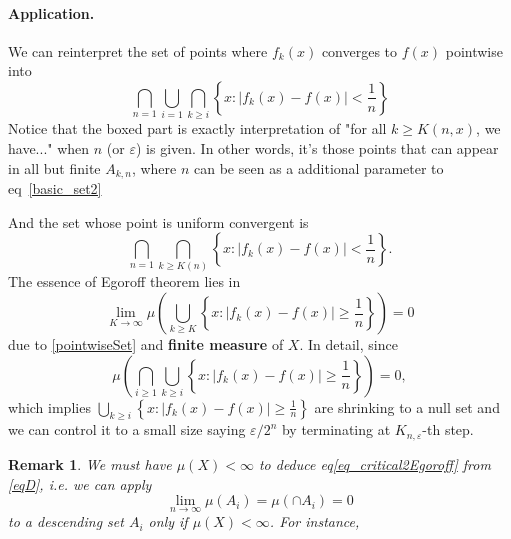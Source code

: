 \documentclass[dvipsnames]{article}
\numberwithin{equation}{section}
\newtheorem{Remark}[Theorem]{Remark}
\begin{document}
\paragraph{Application.} We can reinterpret the set of points where $f_{k}(x)$ converges to $f(x)$ pointwise into
\begin{equation}
    \label{pointwiseSet}
    \bigcap_{n=1} \boxed{\bigcup_{i=1} \bigcap_{k\geq i} \left\{x: |f_{k}(x)-f(x)|<\frac{1}{n}\right\}}
\end{equation}
Notice that the boxed part is exactly interpretation of "for all $k\geq K(n, x)$, we have..." when $n$ (or $\varepsilon$) is given. In other words, it's those points that can appear in all but finite $A_{k,n}$, where $n$ can be seen as a additional parameter to eq~\eqref{basic_set2} 

And the set whose point is uniform convergent is 
\begin{equation}
\label{uniformSet}
    \bigcap_{n=1} \boxed{\bigcap_{k\geq K(n)} \left\{x: |f_{k}(x)-f(x)|<\frac{1}{n}\right\}}.
\end{equation}
The essence of Egoroff theorem lies in 
\begin{equation}
\label{eq_critical2Egoroff}
    \lim_{K\to \infty} \mu\left(\bigcup_{k\geq K} \left\{x: |f_{k}(x)-f(x)|\geq \frac{1}{n}\right\}\right) = 0
\end{equation}
due to \eqref{pointwiseSet} and \textbf{finite measure} of $X$. In detail, since 
\begin{equation}
    \label{eqD}
    \mu\left(\bigcap _{i\geq 1} \bigcup_{k\geq i} \left\{x: |f_{k}(x)-f(x)|\geq \frac{1}{n}\right\}\right) = 0,
\end{equation}
which implies $\bigcup_{k\geq i} \left\{x: |f_{k}(x)-f(x)|\geq \frac{1}{n}\right\}$ are shrinking to a null set and we can control it to a small size saying $\varepsilon/2^n$ by terminating at $K_{n, \varepsilon}$-th step.

\begin{Remark}
    We must have $\mu(X)<\infty$ to deduce eq\eqref{eq_critical2Egoroff} from \eqref{eqD}, i.e. we can apply
    $$
    \lim_{n\to\infty} \mu(A_{i}) =\mu(\cap A_{i}) = 0
    $$
    to a descending set $A_{i}$ only if $\mu(X)<\infty$. For instance,
    
    \vspace{0.4cm}
    
    \vspace{0.4cm}
\end{Remark}
\end{document}
